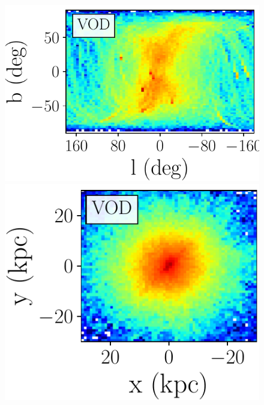 \documentclass[a4paper,useAMS,usenatbib]{mnras}
\begin{document}
\begin{figure}
             \\ \includegraphics[scale=0.302]{VOD_orbits_8Gyrs_lb_defaultmass.pdf}
             \includegraphics[scale=0.302]{VOD_orbits_8Gyrs_xy_defaultmass.pdf}

\end{figure}
\end{document}
